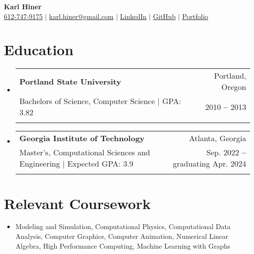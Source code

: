 \documentclass[letterpaper,11pt]{article}
\makeatletter
\newcommand{\resumeItem}[1]{
  \item\small{
    {#1 \vspace{-2pt}}
  }
}
\newcommand{\resumeEducationHeading}[6]{
  \vspace{-2pt}\item
    \begin{tabular*}{0.97\textwidth}[t]{l@{\extracolsep{\fill}}r}
      \textbf{#1} & \small #2 \\
      \small#3 & \small #4 \\
      \small#5 & \small #6 \\
    \end{tabular*}\vspace{-1.75em}
}
\newcommand{\resumeSubHeadingListStart}{\begin{itemize}[leftmargin=0.15in, label={}]}
\newcommand{\resumeSubHeadingListEnd}{\end{itemize}}
\makeatother
\begin{document}

\hypersetup{urlcolor = black} %

\begin{center}
    \textbf{\Huge Karl Hiner} \\ \vspace{3pt}
    \small
    \faMobile \hspace{.5pt} \href{tel:6127479175}{612-747-9175}
    $|$
    \faAt \hspace{.5pt} \href{mailto:karl.hiner@gmail.com}{karl.hiner@gmail.com}
    $|$
    \faLinkedinSquare \hspace{.5pt} \href{https://www.linkedin.com/in/karl-hiner-9534b333}{LinkedIn}
    $|$
    \faGithub \hspace{.5pt} \href{https://github.com/khiner}{GitHub}
    $|$
    \faGlobe \hspace{.5pt} \href{https://karlhiner.com}{Portfolio}
\end{center}
\vspace{-18pt}

\hypersetup{urlcolor = linkcolor} %

\section{Education}
  \vspace{1pt}
  \resumeSubHeadingListStart
    \resumeEducationHeading
      {Portland State University}{Portland, Oregon}
      {Bachelors of Science, Computer Science $|$ \footnotesize{GPA: 3.82}}{2010 \textbf{--} 2013}{}{}
    \resumeEducationHeading
      {Georgia Institute of Technology}{Atlanta, Georgia}
      {Master's, Computational Sciences and Engineering $|$ \footnotesize{Expected GPA: 3.9}}{Sep. 2022 \textbf{--} graduating Apr. 2024}{}{}
  \resumeSubHeadingListEnd

\section{Relevant Coursework}
  \resumeSubHeadingListStart
    \resumeItem{Modeling and Simulation, Computational Physics, Computational Data Analysis, Computer Graphics, Computer Animation, Numerical Linear Algebra, High Performance Computing, Machine Learning with Graphs}
    \resumeSubHeadingListEnd
    \vspace{-15pt}
\end{document}

